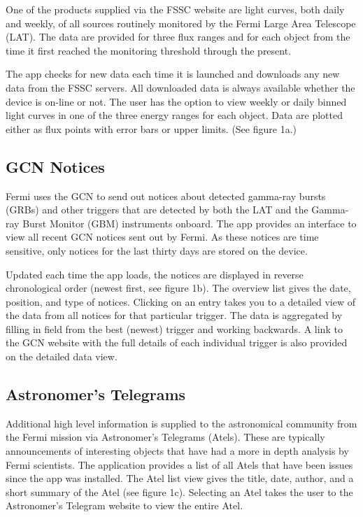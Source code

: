 \documentclass[11pt,twoside]{article}
\begin{document}
One of the products supplied via the FSSC website are light curves, both daily and weekly, of all sources routinely monitored by the Fermi Large Area Telescope (LAT).  The data are provided for three flux ranges and for each object from the time it first reached the monitoring threshold through the present.

The app checks for new data each time it is launched and downloads any new data from the FSSC servers.  All downloaded data is always available whether the device is on-line or not.  The user has the option to view weekly or daily binned light curves in one of the three energy ranges for each object.  Data are plotted either as flux points with error bars or upper limits. (See figure 1a.)

\subsection{GCN Notices}
Fermi uses the GCN to send out notices about detected gamma-ray bursts (GRBs) and other triggers that are detected by both the LAT and the Gamma-ray Burst Monitor (GBM) instruments onboard.  The app provides an interface to view all recent GCN notices sent out by Fermi.  As these notices are time sensitive, only notices for the last thirty days are stored on the device.

Updated each time the app loads, the notices are displayed in reverse chronological order (newest first, see figure 1b).  The overview list gives the date, position, and type of notices.  Clicking on an entry takes you to a detailed view of the data from all notices for that particular trigger.  The data is aggregated by filling in field from the best (newest) trigger and working backwards.  A link to the GCN website with the full details of each individual trigger is also provided on the detailed data view.

\subsection{Astronomer's Telegrams}
Additional high level information is supplied to the astronomical community from the Fermi mission via Astronomer's Telegrams (Atels).  These are typically announcements of interesting objects that have had a more in depth analysis by Fermi scientists.  The application provides a list of all Atels that have been issues since the app was installed.  The Atel list view gives the title, date, author, and a short summary of the Atel (see figure 1c).  Selecting an Atel takes the user to the Astronomer's Telegram website to view the entire Atel.
\end{document}
